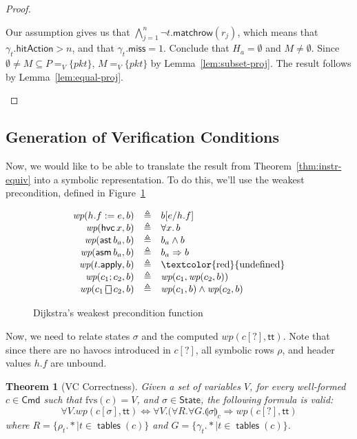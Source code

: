 \documentclass{article}
\newcommand{\pkt}{\mathit{pkt}}
\newcommand{\TRUE}{\mathsf{tt}}
\newcommand{\Cmd}{\mathsf{Cmd}}
\newcommand{\State}{\mathsf{State}}
\newcommand{\hitAction}{\mathsf{hitAction}}
\newcommand{\miss}{\mathsf{miss}}
\newcommand{\assert}{\mathop{\mathsf{ast}}}
\newcommand{\assume}{\mathop{\mathsf{asm}}}
\newcommand{\apply}{\mathsf{apply}}
\newcommand{\choiceop}{\rotatebox[origin=c]{90}{$\sqsubset\!\!\!\sqsupset$}}
\newcommand{\choice}{\mathbin{\choiceop}}
\newcommand{\havoc}[1]{\mathop{\mathsf{hvc}}#1}
\newcommand{\WP}{\textit{wp}}
\newcommand{\state}[1]{\llparenthesis#1\rrparenthesis}
\newcommand{\instr}{[?]}
\newcommand{\fvs}{\textrm{fvs}}
\newcommand{\matchrow}{\mathsf{matchrow}}
\newcommand{\tables}{\mathop{\mathsf{tables}}}
\theoremstyle{plain}
\newtheorem{theorem}{Theorem}
\theoremstyle{definition}
\theoremstyle{remark}
\begin{document}
\begin{proof}
\begin{enumerate}[align=left]
\begin{enumerate}
        Our assumption gives us that $\bigwedge_{j=1}^n \neg t.\matchrow(r_j)$,
        which means that $\gamma_t.\hitAction > n$, and that $\gamma_t.\miss =
        1$. Conclude that $H_a = \emptyset$ and $M \neq \emptyset$. Since
        $\emptyset \neq M \subseteq P =_V \{\pkt\}$, $M =_V \{\pkt\}$ by
        Lemma~\ref{lem:subset-proj}. The result follows by
        Lemma~\ref{lem:equal-proj}.
    \end{enumerate}

  \end{enumerate}
\end{proof}

\subsection{Generation of Verification Conditions}

Now, we would like to be able to translate the result from
Theorem~\ref{thm:instr-equiv} into a symbolic representation. To do this, we'll
use the weakest precondition, defined in Figure~\ref{fig:wp}

\begin{figure}[H]
  \[
  \begin{array}{r >{\triangleq}c l}
    \WP(h.f := e, b)
    && b[e/h.f] \\
    \WP(\havoc x, b)
    && \forall x.\,b \\
    \WP(\assert b_a, b)
    && b_a \wedge b \\
    \WP(\assume b_a, b)
    && b_a \Rightarrow b \\
    \WP(t.\apply,b) && \textrm{\textcolor{red}{undefined}} \\
    \WP(c_1;c_2, b)
    && \WP(c_1,\WP(c_2,b)) \\
    \WP(c_1 \choice c_2, b)
    && \WP(c_1,b) \wedge \WP(c_2,b)
  \end{array}
  \]
  \caption{Dijkstra's weakest precondition function}
  \label{fig:wp}
\end{figure}

Now, we need to relate states $\sigma$ and the computed $\WP(c\instr,\TRUE)$.
Note that since there are no havocs introduced in $c\instr$, all symbolic rows
$\rho$, and header values $h.f$ are unbound.

\begin{theorem}[VC Correctness]
  \label{thm:vc-correct}
  Given a set of variables $V$, for every well-formed $c \in \Cmd$ such that $\fvs(c) = V$,
  and $\sigma \in \State$, the following formula is valid:
  \[ \forall V. \WP(c[\sigma], \TRUE) \iff \forall V. (\forall R. \forall G. \state\sigma_c \Rightarrow  \WP(c\instr,\TRUE)\]
  where $R = \{\rho_t.* \mid t \in \tables(c)\}$ and $G = \{\gamma_t.*\mid t \in \tables (c)\}$.
\end{theorem}
\end{document}
